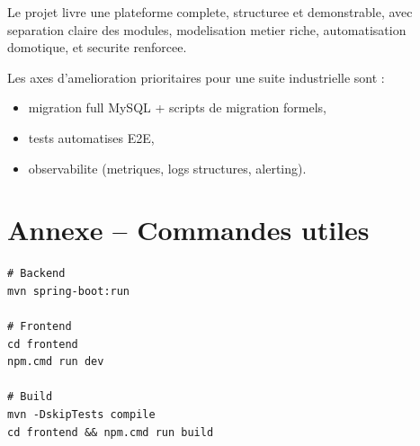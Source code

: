\documentclass[11pt,a4paper]{article}
\begin{document}
Le projet livre une plateforme complete, structuree et demonstrable,
avec separation claire des modules, modelisation metier riche,
automatisation domotique, et securite renforcee.

Les axes d'amelioration prioritaires pour une suite industrielle sont :
\begin{itemize}
  \item migration full MySQL + scripts de migration formels,
  \item tests automatises E2E,
  \item observabilite (metriques, logs structures, alerting).
\end{itemize}

\section*{Annexe -- Commandes utiles}

\begin{Verbatim}[fontsize=\small]
# Backend
mvn spring-boot:run

# Frontend
cd frontend
npm.cmd run dev

# Build
mvn -DskipTests compile
cd frontend && npm.cmd run build
\end{Verbatim}
\end{document}
